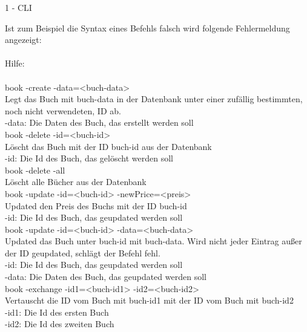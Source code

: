 \documentclass[a4paper]{article}
\begin{document}
\begin{exercise}{1 - CLI}
\begin{itemize}
Ist zum Beispiel die Syntax eines Befehls falsch wird folgende Fehlermeldung angezeigt:\\\\

Hilfe:\\\\

book -create -data=<buch-data>\\
  Legt das Buch mit buch-data in der Datenbank unter einer zufällig bestimmten, noch nicht verwendeten, ID ab.\\
  -data: Die Daten des Buch, das erstellt werden soll\\

book -delete -id=<buch-id>\\
  Löscht das Buch mit der ID buch-id aus der Datenbank\\
  -id: Die Id des Buch, das gelöscht werden soll\\

book -delete -all\\
  Löscht alle Bücher aus der Datenbank\\

book -update -id=<buch-id> -newPrice=<preis>\\
  Updated den Preis des Buchs mit der ID buch-id\\
  -id: Die Id des Buch, das geupdated werden soll\\

book -update -id=<buch-id> -data=<buch-data>\\
  Updated das Buch unter buch-id mit buch-data. Wird nicht jeder Eintrag außer der ID geupdated, schlägt der Befehl fehl.\\
  -id: Die Id des Buch, das geupdated werden soll\\
  -data: Die Daten des Buch, das geupdated werden soll\\

book -exchange -id1=<buch-id1> -id2=<buch-id2>\\
  Vertauscht die ID vom Buch mit buch-id1 mit der ID vom Buch mit buch-id2\\
  -id1: Die Id des ersten Buch\\
  -id2: Die Id des zweiten Buch\\
\end{itemize}
\end{exercise}
\end{document}
